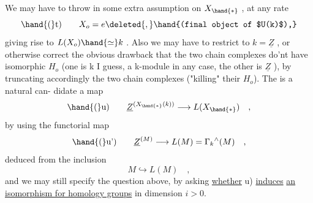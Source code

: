 We may have to throw in some extra assumption on $X_{\hand{*}}$ , at any rate
\[ \hand{(}\text{t)} \qquad X_o = e \deleted{,} \hand{(final object of $U(k)$),} \]
 giving rise to  $L(X_o)\hand{\simeq} k$ . Also we may
have to restrict to $k=\underline{Z}$ , or otherwise correct the obvious drawback that
the two chain complexes do'nt have isomorphic $H_o$ (one is k I guess,
a k-module in any case, the other is $\underline{Z}$ ), by truncating accordingly
the two chain complexes ("killing" their $H_o$). The is a natural can-%
didate  a map
\[ \hand{(}\text{u)} \qquad \underline{Z}^{(X_{\hand{*}}(k))} \longrightarrow L(X_{\hand{*}}) \quad , \]
by using the functorial map
\[ \hand{(}\text{u')} \qquad \underline{Z}^{(M)} \longrightarrow L(M) = \Gamma_k{}^{\wedge}(M) \quad , \]
deduced from the inclusion 
\[ M \hookrightarrow L(M) \quad , \]
and we may still specify the question above, by asking \uline{whether} \hand{(}u) \uline{induces}
\uline{an isomorphism for homology groups} in dimension $i>0$.

